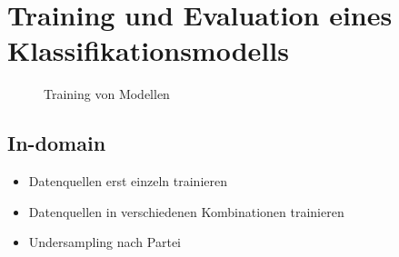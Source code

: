 
\chapter{Training und Evaluation eines Klassifikationsmodells} \label{ch:crispDm_2}


\begin{figure}[H]
    \centering
    \caption{Training von Modellen} \label{fig:dataFlow_2}
\end{figure}

\section{In-domain} \label{sec:modeling}


\begin{itemize}
    \item Datenquellen erst einzeln trainieren
    \item Datenquellen in verschiedenen Kombinationen trainieren
    \item Undersampling nach Partei 
\end{itemize}







